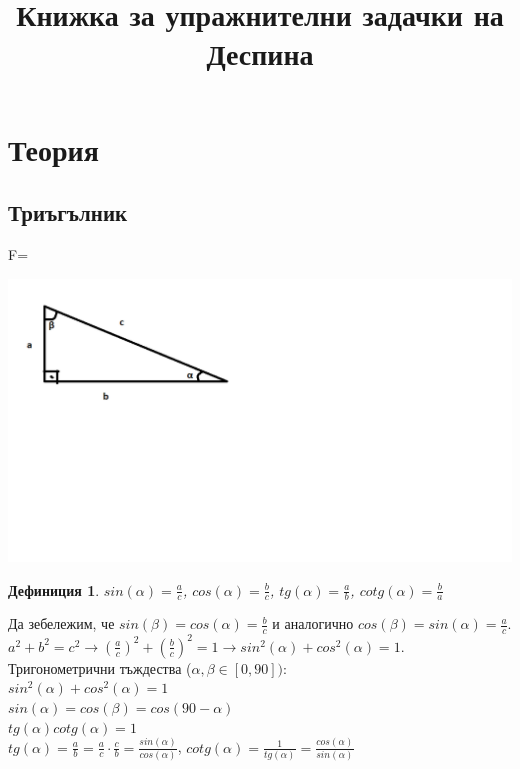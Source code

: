 \documentclass{article}
\date{}
\title{Книжка за упражнителни задачки на Деспина}
\newtheorem{definition}{Дефиниция}
\begin{document}
	
	
	\maketitle
	\tableofcontents
	
	\section{Теория}
	
	\subsection{Триъгълник}
	
	
F=
	
	
	
	\includegraphics{Trig1}
	
	\vspace{-8cm}
	
	\begin{definition}$ sin(\alpha) = \frac{a}{c} $, $ cos(\alpha) = \frac{b}{c} $, $tg(\alpha) = \frac{a}{b} $, $cotg(\alpha) = \frac{b}{a} $	
	\end{definition}
Да зебележим, че $ sin(\beta) = cos(\alpha) = \frac{b}{c} $ и аналогично $cos(\beta) = sin(\alpha ) = \frac{a}{c} $.
$a^2 + b^2 = c^2  \to (\frac{a}{c})^2 + (\frac{b}{c})^2 = 1 \to sin^2(\alpha) + cos^2(\alpha) = 1$. \\
Тригонометрични тъждества ($\alpha, \beta \in [0,90] )$: \\
$sin^2(\alpha) + cos^2(\alpha) = 1$ \\
$ sin(\alpha) = cos(\beta) = cos(90 - \alpha) $ \\
$ tg(\alpha)cotg(\alpha) = 1 $ \\
$ tg(\alpha) = \frac{a}{b} = \frac{a}{c} \cdot \frac{c}{b} = \frac{sin(\alpha)}{cos(\alpha)} $, $cotg(\alpha) = \frac{1}{tg(\alpha)} = \frac{cos(\alpha)}{sin(\alpha)} $ 
\end{document}
